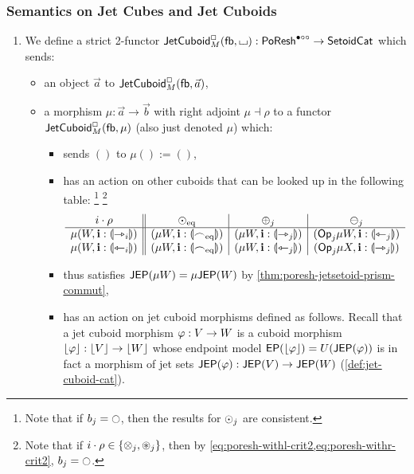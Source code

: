 \documentclass[a4paper]{memoir}
\begin{document}
\subsubsection{Semantics on Jet Cubes and Jet Cuboids}
\label{sec:poresh-jetcuboid}
\label{sec:poresh-jetcube:sub}
\begin{definition}
	\begin{enumerate}
		\item We define a strict 2-functor $\mathsf{JetCuboid}^{\Box}_{M}({\mathsf{fb}},{\llcorner\hspace{-.4ex}\lrcorner}) : \mathsf{PoResh}^{\bullet \circ \circ} \to {\mathsf{Setoid}}{\mathsf{Cat}}$ which sends:
		\begin{itemize}
			\item an object $\vec a$ to $\mathsf{JetCuboid}^{\Box}_{M}({\mathsf{fb}},\vec a)$,
			\item a morphism $\mu : \vec a \to \vec b$ with right adjoint $\mu \dashv \rho$ to a functor $\mathsf{JetCuboid}^{\Box}_{M}({\mathsf{fb}},\mu)$ (also just denoted $\mu$) which:
			\begin{itemize}
				\item sends $()$ to $\mu () := ()$,
				\item has an action on other cuboids that can be looked up in the following table:%
				\footnote{Note that if $b_j = \npolar$, then the results for ${\odot}_j$ are consistent.}%
				\footnote{Note that if $i \cdot \rho \in \mathopen{}\left\{ {\otimes}_j, {\oast}_j \right\}\mathclose{}$, then by \cref{eq:poresh-withl-crit2,eq:poresh-withr-crit2}, $b_j = \npolar$.}
				\[
					\begin{array}{c || c | c | c}
						i \cdot \rho 
						& {\odot}_{\mathrm{eq}} 
						& {\oplus}_j
						& {\ominus}_j 
						\\ \hline
						\mu(W, \mathbf{i} : {\llparenthesis {\rightarrowtriangle}_i \rrparenthesis})
						& (\mu W, \mathbf{i} : {\llparenthesis {\frown}_{\mathrm{eq}} \rrparenthesis})
						& (\mu W, \mathbf{i} : {\llparenthesis {\rightarrowtriangle}_j \rrparenthesis})
						& ({\mathsf{Op}}_j \mu W, \mathbf{i} : {\llparenthesis {\leftarrowtriangle}_j \rrparenthesis})
						\\
						\mu(W, \mathbf{i} : {\llparenthesis {\leftarrowtriangle}_i \rrparenthesis})
						& (\mu W, \mathbf{i} : {\llparenthesis {\frown}_{\mathrm{eq}} \rrparenthesis})
						& (\mu W, \mathbf{i} : {\llparenthesis {\leftarrowtriangle}_j \rrparenthesis})
						& ({\mathsf{Op}}_j\mu X, \mathbf{i} : {\llparenthesis {\rightarrowtriangle}_j \rrparenthesis})
					\end{array}
				\]
				\item thus satisfies $\mathsf{JEP}(\mu W) = \mu \mathsf{JEP}(W)$ by \cref{thm:poresh-jetsetoid-prism-commut},
				\item has an action on jet cuboid morphisms defined as follows. Recall that a jet cuboid morphism $\varphi : V \to W$ is a cuboid morphism $\mathopen{}\left\lfloor \varphi \right\rfloor\mathclose{} : \mathopen{}\left\lfloor V \right\rfloor\mathclose{} \to \mathopen{}\left\lfloor W \right\rfloor\mathclose{}$ whose endpoint model $\mathsf{EP}(\mathopen{}\left\lfloor \varphi \right\rfloor\mathclose{}) = U(\mathsf{JEP}(\varphi))$ is in fact a morphism of jet sets $\mathsf{JEP}(\varphi) : \mathsf{JEP}(V) \to \mathsf{JEP}(W)$ (\cref{def:jet-cuboid-cat}).

\end{itemize}
\end{itemize}
\end{enumerate}
\end{definition}
\end{document}
